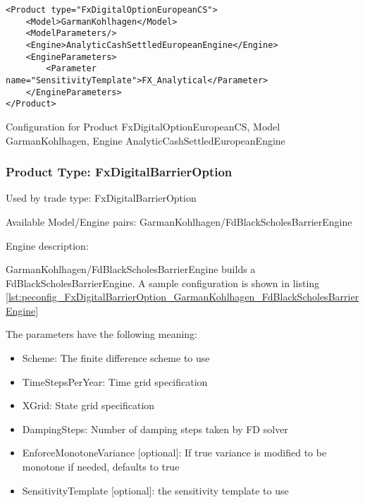 \begin{longlisting}
\begin{verbatim}
<Product type="FxDigitalOptionEuropeanCS">
    <Model>GarmanKohlhagen</Model>
    <ModelParameters/>
    <Engine>AnalyticCashSettledEuropeanEngine</Engine>
    <EngineParameters>
        <Parameter name="SensitivityTemplate">FX_Analytical</Parameter>
    </EngineParameters>
</Product>
\end{verbatim}
\caption{Configuration for Product FxDigitalOptionEuropeanCS, Model GarmanKohlhagen, Engine AnalyticCashSettledEuropeanEngine}
\label{lst:peconfig_FxDigitalOptionEuropeanCS_GarmanKohlhagen_AnalyticCashSettledEuropeanEngine}
\end{longlisting}

\subsubsection{Product Type: FxDigitalBarrierOption}

Used by trade type: FxDigitalBarrierOption

Available Model/Engine pairs: GarmanKohlhagen/FdBlackScholesBarrierEngine

Engine description:

GarmanKohlhagen/FdBlackScholesBarrierEngine builds a FdBlackScholesBarrierEngine. A sample configuration is shown in
listing \ref{lst:peconfig_FxDigitalBarrierOption_GarmanKohlhagen_FdBlackScholesBarrierEngine}

The parameters have the following meaning:

\begin{itemize}
\item Scheme: The finite difference scheme to use
\item TimeStepsPerYear: Time grid specification
\item XGrid: State grid specification
\item DampingSteps: Number of damping steps taken by FD solver
\item EnforceMonotoneVariance [optional]: If true variance is modified to be monotone if needed, defaults to true
\item SensitivityTemplate [optional]: the sensitivity template to use 
\end{itemize}

